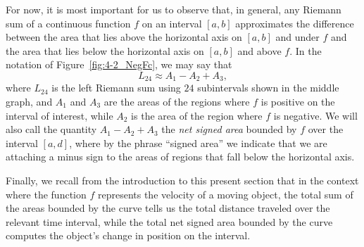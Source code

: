 For now, it is most important for us to observe that, in general, any Riemann sum of a continuous function $f$ on an interval $[a,b]$ approximates the difference between the area that lies above the horizontal axis on $[a,b]$ and under $f$ and the area that lies below the horizontal axis on $[a,b]$ and above $f$.  In the notation of Figure~\ref{fig:4-2_NegFc}, we may say that
$$L_{24} \approx A_1 - A_2 + A_3,$$
where $L_{24}$ is the left Riemann sum using $24$ subintervals shown in the middle graph, and $A_1$ and $A_3$ are the areas of the regions where $f$ is positive on the interval of interest, while $A_2$ is the area of the region where $f$ is negative.  We will also call the quantity $A_1 - A_2 + A_3$ the \emph{net signed area}  bounded by $f$ over the interval $[a,d]$, where by the phrase ``signed area'' we indicate that we are attaching a minus sign to the areas of regions that fall below the horizontal axis.

Finally, we recall from the introduction to this present section that in the context where the function $f$ represents the velocity of a moving object, the total sum of the areas bounded by the curve tells us the total distance traveled over the relevant time interval, while the total net signed area bounded by the curve computes the object's change in position on the interval.


\newpage

\vspace*{-.5cm}


\vspace*{-.5cm}

